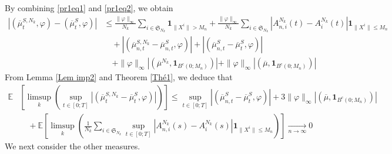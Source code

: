 \documentclass[notitlepage,reqno,11pt]{amsart}
\numberwithin{equation}{section}
\begin{document}
By combining \eqref{pr1eq1} and \eqref{pr1eq2}, we obtain
\begin{align*}
\left|( \overline{\mu}_{t}^{S,N_k},\varphi )-( \overline{\mu}_{t}^{S},\varphi )\right|&\leq \frac{\|\varphi\|_{\infty}}{N_k}\sum_{i\in \mathfrak{S}_{N_k}}\mathbf{1}_{\|X^i\|>M_n}+\frac{\|\varphi\|_{\infty}}{N_k}\sum_{i\in\mathfrak{S}_{N_k}}\left|A_{n,i}^{N_k}(t)-A_{i}^{N_k}(t)\right|\mathbf{1}_{\|X^i\|\leq M_n}\\
&\quad+\left|(  \overline{\mu}_{n,t}^{S,N_k}- \overline{\mu}_{n,t}^{S},\varphi )\right|+\left|(  \overline{\mu}_{n,t}^{S}- \overline{\mu}_{t}^{S},\varphi )\right|\\
&\quad+\|\varphi\|_{\infty}\left|( \overline{\mu}^{N_k}, \mathbf{1}_{B^c(0;M_n) })\right|+\|\varphi\|_{\infty}\left|( \overline{\mu}, \mathbf{1}_{B^c(0;M_n) })\right|
\end{align*}
From Lemma \ref{Lem imp2} and Theorem \ref{Thé1}, we deduce that
\begin{align}
\label{pr1eq3}
\mathbb{E}&\left[\limsup_{k}\left(\sup_{t\in[0;T]}\left|( \overline{\mu}_{t}^{S,N_k}-\overline{\mu}_{t}^{S},\varphi ) \right|\right)\right]\leq \sup_{t\in[0;T]}\left|(  \overline{\mu}_{n,t}^{S}- \overline{\mu}_{t}^{S},\varphi )\right|+3\|\varphi\|_{\infty}\left|( \overline{\mu}, \mathbf{1}_{B^c(0;M_n) })\right|\nonumber\\
&\quad+ \mathbb{E}\left[\displaystyle\limsup_{k}\left(\displaystyle\frac{1}{N_k}\sum_{i\in\mathfrak{S}_{N_k}}\sup_{t\in[0;T]}\left| A^{N_k}_{n,i}(s)-A^{N_k}_{i}(s)\right|\mathbf{1}_{\|X^i\|\leq M_n}\right)\right]\xrightarrow[n \to \infty]{} 0
\end{align}
We next consider the other measures.
\end{document}
